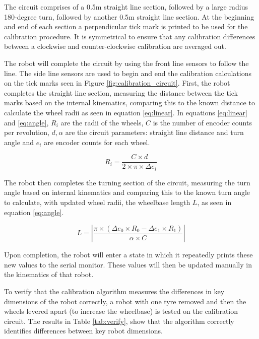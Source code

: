 \documentclass[conference]{IEEEtran}
\begin{document}
The circuit comprises of a 0.5m straight line section, followed by a large radius 180-degree turn, followed by another 0.5m straight line section. 
At the beginning and end of each section a perpendicular tick mark is printed to be used for the calibration procedure. 
It is symmetrical to ensure that any calibration differences between a clockwise and counter-clockwise calibration are averaged out.

The robot will complete the circuit by using the front line sensors to follow the line. 
The side line sensors are used to begin and end the calibration calculations on the tick marks seen in Figure \ref{fig:calibration_circuit}. 
First, the robot completes the straight line section, measuring the distance between the tick marks based on the internal kinematics, comparing this to the known distance to calculate the wheel radii as seen in equation \ref{eq:linear}. 
In equations \ref{eq:linear} and \ref{eq:angle}, $R_i$ are the radii of the wheels, $C$ is the number of encoder counts per revolution, $d,\alpha$ are the circuit parameters: straight line distance and turn angle and $e_i$ are encoder counts for each wheel.

\begin{equation}
\label{eq:linear}
    R_i = \frac{C \times d}{2 \times \pi \times \Delta e_i}
\end{equation}

The robot then completes the turning section of the circuit, measuring the turn angle based on internal kinematics and comparing this to the known turn angle to calculate, with updated wheel radii, the wheelbase length $L$, as seen in equation \ref{eq:angle}.

\begin{equation}
\label{eq:angle}
L = \left|\frac{\pi \times (\Delta e_0 \times R_0 - \Delta e_1 \times R_1)}{\alpha \times C}\right|
\end{equation}

Upon completion, the robot will enter a state in which it repeatedly prints these new values to the serial monitor. These values will then be updated manually in the kinematics of that robot.

To verify that the calibration algorithm measures the differences in key dimensions of the robot correctly, a robot with one tyre removed and then the wheels levered apart (to increase the wheelbase) is tested on the calibration circuit. The results in Table \ref{tab:verify}, show that the algorithm correctly identifies differences between key robot dimensions.
\end{document}
